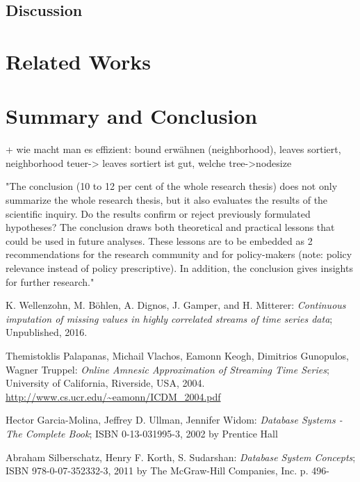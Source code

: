 \documentclass[abstracton,12pt]{scrreprt}
\begin{document}
\section{Discussion}


\chapter{Related Works}


\chapter{Summary and Conclusion}
\label{sec:Summary}

+ wie macht man es effizient: bound erwähnen (neighborhood), leaves sortiert, neighborhood teuer-> leaves sortiert ist gut, 
welche tree->nodesize


"The conclusion (10 to 12 per cent of the whole research thesis) does not only summarize the whole research thesis, but it also evaluates the results of the scientific inquiry. Do the results confirm or reject previously formulated hypotheses? The conclusion draws both theoretical and practical lessons that could be used in future analyses. These lessons are to be embedded as
2
recommendations for the research community and for policy-makers (note: policy relevance instead of policy prescriptive). In addition, the conclusion gives insights for further research."

\begin{thebibliography}{99}
	
	
	 K. Wellenzohn, M. Böhlen, A. Dignos, J. Gamper, and H. Mitterer: \emph{Continuous imputation of missing values in highly correlated streams of time series data}; Unpublished, 2016.
	
	 Themistoklis Palapanas, Michail Vlachos, Eamonn Keogh, Dimitrios Gunopulos, Wagner Truppel: \emph{Online Amnesic Approximation of Streaming Time Series}; University of California, Riverside, USA, 2004. \url{http://www.cs.ucr.edu/~eamonn/ICDM_2004.pdf}

	 Hector Garcia-Molina, Jeffrey D. Ullman, Jennifer Widom: \emph{Database Systems - The Complete Book}; ISBN 0-13-031995-3, 2002 by Prentice Hall
		
	 Abraham Silberschatz, Henry F. Korth, S. Sudarshan: \emph{Database System Concepts}; ISBN 978-0-07-352332-3, 2011 by The McGraw-Hill Companies, Inc. p. 496-



\end{thebibliography}
\end{document}
